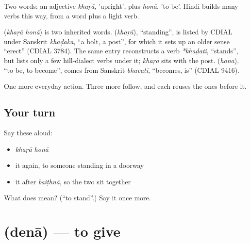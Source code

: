 Two words: an adjective \emph{khaṛā}, 'upright', plus \emph{honā}, 'to be'. Hindi builds many verbs this way, from a word plus a light verb.

\begin{cousinweb}
\textbf{ } (\emph{khaṛā honā}) is two inherited words. \textbf{} (\emph{khaṛā}), \textquotedblleft{}standing\textquotedblright{}, is listed by CDIAL under Sanskrit \emph{khaḍaka}, \textquotedblleft{}a bolt, a post\textquotedblright{}, for which it sets up an older sense \textquotedblleft{}erect\textquotedblright{} (CDIAL 3784). The same entry reconstructs a verb \emph{*khaḍati}, \textquotedblleft{}stands\textquotedblright{}, but lists only a few hill-dialect verbs under it; \emph{khaṛā} sits with the post. \textbf{} (\emph{honā}), \textquotedblleft{}to be, to become\textquotedblright{}, comes from Sanskrit \emph{bhavati}, \textquotedblleft{}becomes, is\textquotedblright{} (CDIAL 9416).
\end{cousinweb}

\begin{grammarlens}[title={What you've built}]
One more everyday action. Three more follow, and each reuses the ones before it.
\end{grammarlens}

\subsection*{Your turn}
Say these aloud:

\begin{itemize}
\raggedright
  \item \emph{khaṛā honā}
  \item it again, to someone standing in a doorway
  \item it after \emph{baiṭhnā}, so the two sit together
\end{itemize}

\begin{tcolorbox}[breakable,colback=teal!4,colframe=teal!35!black,title={Before you move on}]
What does   mean? (\textquotedblleft{}to stand\textquotedblright{}.) Say it once more.
\end{tcolorbox}
\section[\texorpdfstring{\hi{देना} (denā)}{देना (denā)}]{ (denā) — to give}

\label{lesson:HI-C42-give}



